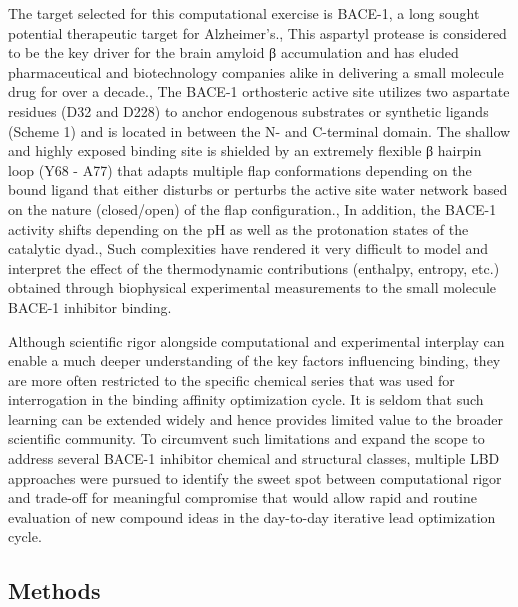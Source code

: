 The target selected for this computational exercise is BACE-1, a long sought potential therapeutic target for Alzheimer’s.,  This aspartyl protease is considered to be the key driver for the brain amyloid β accumulation and has eluded pharmaceutical and biotechnology companies alike in delivering a small molecule drug for over a decade.,  The BACE-1 orthosteric active site utilizes two aspartate residues (D32 and D228) to anchor endogenous substrates or synthetic ligands (Scheme 1) and is located in between the N- and C-terminal domain.  The shallow and highly exposed binding site is shielded by an extremely flexible β hairpin loop (Y68 - A77) that adapts multiple flap conformations depending on the bound ligand that either disturbs or perturbs the active site water network based on the nature (closed/open) of the flap configuration.,  In addition, the BACE-1 activity shifts depending on the pH as well as the protonation states of the catalytic dyad.,  Such complexities have rendered it very difficult to model and interpret the effect of the thermodynamic contributions (enthalpy, entropy, etc.) obtained through biophysical experimental measurements to the small molecule BACE-1 inhibitor binding.  

Although scientific rigor alongside computational and experimental interplay can enable a much deeper understanding of the key factors influencing binding, they are more often restricted to the specific chemical series that was used for interrogation in the binding affinity optimization cycle.  It is seldom that such learning can be extended widely and hence provides limited value to the broader scientific community.  To circumvent such limitations and expand the scope to address several BACE-1 inhibitor chemical and structural classes, multiple LBD approaches were pursued to identify the sweet spot between computational rigor and trade-off for meaningful compromise that would allow rapid and routine evaluation of new compound ideas in the day-to-day iterative lead optimization cycle.  

\subsection{Methods}

